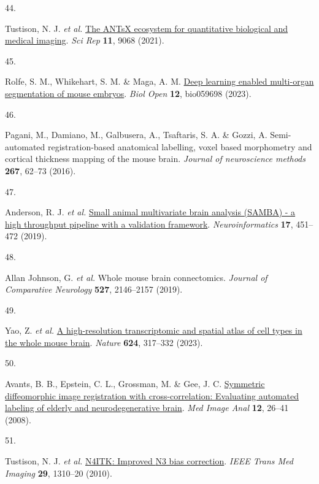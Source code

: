 \documentclass[
  12pt,
]{article}
\newlength{\cslhangindent}
\newlength{\csllabelwidth}
\newenvironment{CSLReferences}[2] %
 {\begin{list}{}{%
  \setlength{\itemindent}{0pt}
  \setlength{\leftmargin}{0pt}
  \setlength{\parsep}{0pt}
  \ifodd #1
   \setlength{\leftmargin}{\cslhangindent}
   \setlength{\itemindent}{-1\cslhangindent}
  \fi
  \setlength{\itemsep}{#2\baselineskip}}}
 {\end{list}}
\newcommand{\CSLLeftMargin}[1]{\parbox[t]{\csllabelwidth}{\strut#1\strut}}
\newcommand{\CSLRightInline}[1]{\parbox[t]{\linewidth - \csllabelwidth}{\strut#1\strut}}
\begin{document}
\begin{CSLReferences}{0}{0}
\CSLLeftMargin{44. }%
\CSLRightInline{Tustison, N. J. \emph{et al.}
\href{https://doi.org/10.1038/s41598-021-87564-6}{The ANTsX ecosystem
for quantitative biological and medical imaging}. \emph{Sci Rep}
\textbf{11}, 9068 (2021).}

\CSLLeftMargin{45. }%
\CSLRightInline{Rolfe, S. M., Whikehart, S. M. \& Maga, A. M.
\href{https://doi.org/10.1242/bio.059698}{Deep learning enabled
multi-organ segmentation of mouse embryos}. \emph{Biol Open}
\textbf{12}, bio059698 (2023).}

\CSLLeftMargin{46. }%
\CSLRightInline{Pagani, M., Damiano, M., Galbusera, A., Tsaftaris, S. A.
\& Gozzi, A. Semi-automated registration-based anatomical labelling,
voxel based morphometry and cortical thickness mapping of the mouse
brain. \emph{Journal of neuroscience methods} \textbf{267}, 62--73
(2016).}

\CSLLeftMargin{47. }%
\CSLRightInline{Anderson, R. J. \emph{et al.}
\href{https://doi.org/10.1007/s12021-018-9410-0}{Small animal
multivariate brain analysis (SAMBA) - a high throughput pipeline with a
validation framework}. \emph{Neuroinformatics} \textbf{17}, 451--472
(2019).}

\CSLLeftMargin{48. }%
\CSLRightInline{Allan Johnson, G. \emph{et al.} Whole mouse brain
connectomics. \emph{Journal of Comparative Neurology} \textbf{527},
2146--2157 (2019).}

\CSLLeftMargin{49. }%
\CSLRightInline{Yao, Z. \emph{et al.}
\href{https://doi.org/10.1038/s41586-023-06812-z}{A high-resolution
transcriptomic and spatial atlas of cell types in the whole mouse
brain}. \emph{Nature} \textbf{624}, 317--332 (2023).}

\CSLLeftMargin{50. }%
\CSLRightInline{Avants, B. B., Epstein, C. L., Grossman, M. \& Gee, J.
C. \href{https://doi.org/10.1016/j.media.2007.06.004}{Symmetric
diffeomorphic image registration with cross-correlation: Evaluating
automated labeling of elderly and neurodegenerative brain}. \emph{Med
Image Anal} \textbf{12}, 26--41 (2008).}

\CSLLeftMargin{51. }%
\CSLRightInline{Tustison, N. J. \emph{et al.}
\href{https://doi.org/10.1109/TMI.2010.2046908}{{N4ITK}: Improved {N3}
bias correction}. \emph{IEEE Trans Med Imaging} \textbf{29}, 1310--20
(2010).}


\end{CSLReferences}
\end{document}
